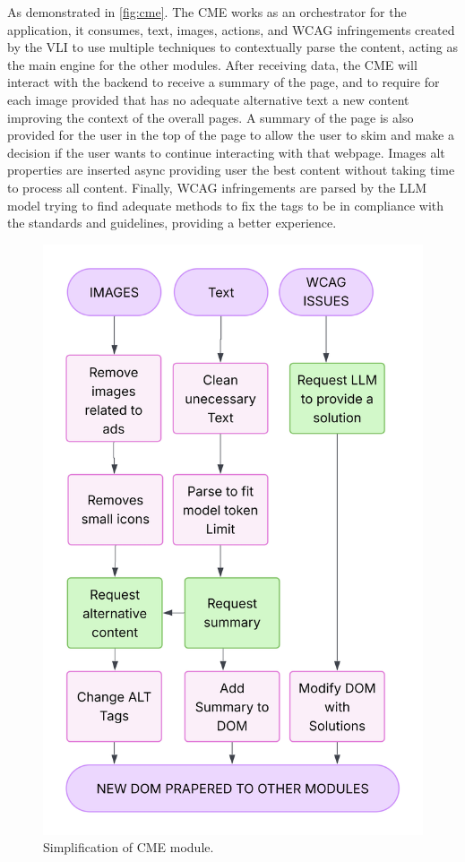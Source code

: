 \documentclass[conference]{IEEEtran}
\begin{document}
As demonstrated in \autoref{fig:cme}. The CME works as an orchestrator for the application, it consumes, text, images, actions, and WCAG infringements created by the VLI to use multiple techniques to contextually parse the content, acting as the main engine for the other modules. After receiving data, the CME will interact with the backend to receive a summary of the page, and to require for each image provided that has no adequate alternative text a new content improving the context of the overall pages. A summary of the page is also provided for the user in the top of the page to allow the user to skim and make a decision if the user wants to continue interacting with that webpage. Images alt properties are inserted async providing user the best content without taking time to process all content. Finally, WCAG infringements are parsed by the LLM model trying to find adequate methods to fix the tags to be in compliance with the standards and guidelines, providing a better experience.

\begin{figure}[h]
\centering
\includegraphics[width=\columnwidth]{images/CME.jpg}
\caption{Simplification of CME module.}
\label{fig:cme}
\end{figure}
\end{document}
